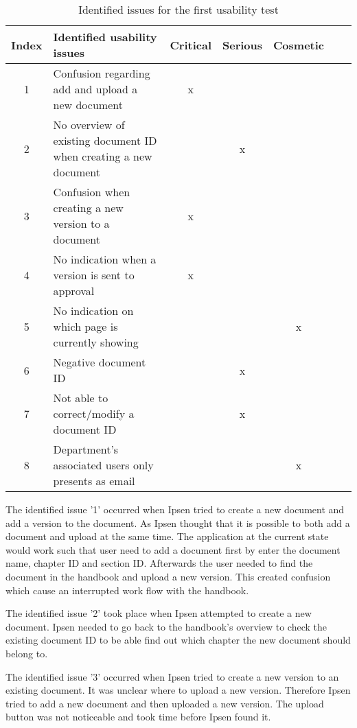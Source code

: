 \begin{table}[H]
	\begin{center}
	\begin{tabular}{| c | m{21em} | c | c | c | c | c |}
		\hline
		Index & \textbf{Identified usability issues} & Critical  & Serious & Cosmetic \\
		\hline
		 1 & Confusion regarding add and upload a new document   & x &  &  \\
		\hline
		 2 & No overview of existing document ID when creating a new document &  & x & \\
		\hline
		 3 & Confusion when creating a new version to a document & x & &  \\
		\hline
		4 & No indication when a version is sent to approval & x & & \\
		\hline
		5 & No indication on which page is currently showing &  &  & x \\
		\hline
		6 & Negative document ID &  & x & \\
		\hline
		7 & Not able to correct/modify a document ID & & x &  \\
		\hline
		8 & Department's associated users only presents as email &  &  & x \\
		\hline
	\end{tabular}
	\end{center}
	\caption{Identified issues for the first usability test}\label{tab:utest1}
\end{table}

The identified issue '1' occurred when Ipsen tried to create a new document and add a version to the document. 
As Ipsen thought that it is possible to both add a document and upload at the same time. 
The application at the current state would work such that user need to add a document first by enter the document name, chapter ID and section ID. 
Afterwards the user needed to find the document in the handbook and upload a new version. 
This created confusion which cause an interrupted work flow with the handbook.

The identified issue '2' took place when Ipsen attempted to create a new document. 
Ipsen needed to go back to the handbook's overview to check the existing document ID to be able find out which chapter the new document should belong to. 

The identified issue '3' occurred when Ipsen tried to create a new version to an existing document. 
It was unclear where to upload a new version. 
Therefore Ipsen tried to add a new document and then uploaded a new version. 
The upload button was not noticeable and took time before Ipsen found it. 

